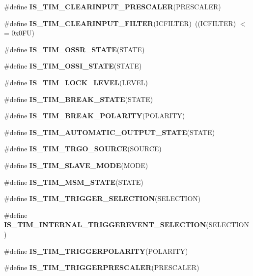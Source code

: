 \begin{DoxyCompactItemize}
\#define {\bfseries I\+S\+\_\+\+T\+I\+M\+\_\+\+C\+L\+E\+A\+R\+I\+N\+P\+U\+T\+\_\+\+P\+R\+E\+S\+C\+A\+L\+ER}(P\+R\+E\+S\+C\+A\+L\+ER)
\item 
\mbox{\label{group___t_i_m___private___macros_gac46ddca5cf26c731771dc3bc3cb724e9}} 
\#define {\bfseries I\+S\+\_\+\+T\+I\+M\+\_\+\+C\+L\+E\+A\+R\+I\+N\+P\+U\+T\+\_\+\+F\+I\+L\+T\+ER}(I\+C\+F\+I\+L\+T\+ER)~((I\+C\+F\+I\+L\+T\+ER) $<$= 0x0\+F\+U)
\item 
\#define {\bfseries I\+S\+\_\+\+T\+I\+M\+\_\+\+O\+S\+S\+R\+\_\+\+S\+T\+A\+TE}(S\+T\+A\+TE)
\item 
\#define {\bfseries I\+S\+\_\+\+T\+I\+M\+\_\+\+O\+S\+S\+I\+\_\+\+S\+T\+A\+TE}(S\+T\+A\+TE)
\item 
\#define {\bfseries I\+S\+\_\+\+T\+I\+M\+\_\+\+L\+O\+C\+K\+\_\+\+L\+E\+V\+EL}(L\+E\+V\+EL)
\item 
\#define {\bfseries I\+S\+\_\+\+T\+I\+M\+\_\+\+B\+R\+E\+A\+K\+\_\+\+S\+T\+A\+TE}(S\+T\+A\+TE)
\item 
\#define {\bfseries I\+S\+\_\+\+T\+I\+M\+\_\+\+B\+R\+E\+A\+K\+\_\+\+P\+O\+L\+A\+R\+I\+TY}(P\+O\+L\+A\+R\+I\+TY)
\item 
\#define {\bfseries I\+S\+\_\+\+T\+I\+M\+\_\+\+A\+U\+T\+O\+M\+A\+T\+I\+C\+\_\+\+O\+U\+T\+P\+U\+T\+\_\+\+S\+T\+A\+TE}(S\+T\+A\+TE)
\item 
\#define {\bfseries I\+S\+\_\+\+T\+I\+M\+\_\+\+T\+R\+G\+O\+\_\+\+S\+O\+U\+R\+CE}(S\+O\+U\+R\+CE)
\item 
\#define {\bfseries I\+S\+\_\+\+T\+I\+M\+\_\+\+S\+L\+A\+V\+E\+\_\+\+M\+O\+DE}(M\+O\+DE)
\item 
\#define {\bfseries I\+S\+\_\+\+T\+I\+M\+\_\+\+M\+S\+M\+\_\+\+S\+T\+A\+TE}(S\+T\+A\+TE)
\item 
\#define {\bfseries I\+S\+\_\+\+T\+I\+M\+\_\+\+T\+R\+I\+G\+G\+E\+R\+\_\+\+S\+E\+L\+E\+C\+T\+I\+ON}(S\+E\+L\+E\+C\+T\+I\+ON)
\item 
\#define {\bfseries I\+S\+\_\+\+T\+I\+M\+\_\+\+I\+N\+T\+E\+R\+N\+A\+L\+\_\+\+T\+R\+I\+G\+G\+E\+R\+E\+V\+E\+N\+T\+\_\+\+S\+E\+L\+E\+C\+T\+I\+ON}(S\+E\+L\+E\+C\+T\+I\+ON)
\item 
\#define {\bfseries I\+S\+\_\+\+T\+I\+M\+\_\+\+T\+R\+I\+G\+G\+E\+R\+P\+O\+L\+A\+R\+I\+TY}(P\+O\+L\+A\+R\+I\+TY)
\item 
\#define {\bfseries I\+S\+\_\+\+T\+I\+M\+\_\+\+T\+R\+I\+G\+G\+E\+R\+P\+R\+E\+S\+C\+A\+L\+ER}(P\+R\+E\+S\+C\+A\+L\+ER)
\item 
\mbox{\label{group___t_i_m___private___macros_gaa1f78b846d7c6c3d54dd35f2ecdabd2f}} 

\end{DoxyCompactItemize}
